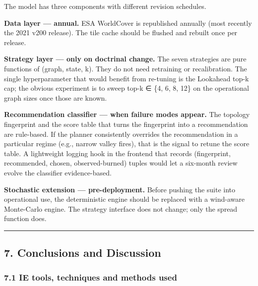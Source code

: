 \documentclass[
  11pt,
]{article}
\begin{document}
The model has three components with different revision schedules.

\textbf{Data layer --- annual.} ESA WorldCover is republished annually
(most recently the 2021 v200 release). The tile cache should be flushed
and rebuilt once per release.

\textbf{Strategy layer --- only on doctrinal change.} The seven
strategies are pure functions of (graph, state, k). They do not need
retraining or recalibration. The single hyperparameter that would
benefit from re-tuning is the Lookahead top-k cap; the obvious
experiment is to sweep top-k ∈ \{4, 6, 8, 12\} on the operational graph
sizes once those are known.

\textbf{Recommendation classifier --- when failure modes appear.} The
topology fingerprint and the score table that turns the fingerprint into
a recommendation are rule-based. If the planner consistently overrides
the recommendation in a particular regime (e.g., narrow valley fires),
that is the signal to retune the score table. A lightweight logging hook
in the frontend that records (fingerprint, recommended, chosen,
observed-burned) tuples would let a six-month review evolve the
classifier evidence-based.

\textbf{Stochastic extension --- pre-deployment.} Before pushing the
suite into operational use, the deterministic engine should be replaced
with a wind-aware Monte-Carlo engine. The strategy interface does not
change; only the spread function does.

\begin{center}\rule{0.5\linewidth}{0.5pt}\end{center}

\subsection{7. Conclusions and
Discussion}\label{conclusions-and-discussion}

\subsubsection{7.1 IE tools, techniques and methods
used}\label{ie-tools-techniques-and-methods-used}
\end{document}
